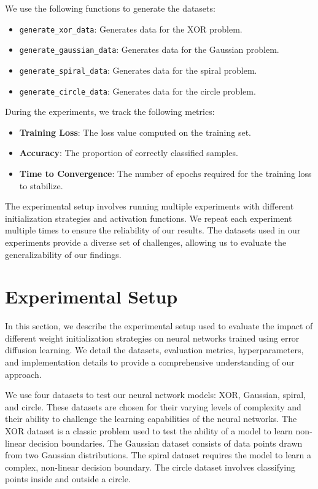 \documentclass{article} %
\begin{document}
We use the following functions to generate the datasets:
\begin{itemize}
    \item \texttt{generate\_xor\_data}: Generates data for the XOR problem.
    \item \texttt{generate\_gaussian\_data}: Generates data for the Gaussian problem.
    \item \texttt{generate\_spiral\_data}: Generates data for the spiral problem.
    \item \texttt{generate\_circle\_data}: Generates data for the circle problem.
\end{itemize}

During the experiments, we track the following metrics:
\begin{itemize}
    \item \textbf{Training Loss}: The loss value computed on the training set.
    \item \textbf{Accuracy}: The proportion of correctly classified samples.
    \item \textbf{Time to Convergence}: The number of epochs required for the training loss to stabilize.
\end{itemize}

The experimental setup involves running multiple experiments with different initialization strategies and activation functions. We repeat each experiment multiple times to ensure the reliability of our results. The datasets used in our experiments provide a diverse set of challenges, allowing us to evaluate the generalizability of our findings.

\section{Experimental Setup}
\label{sec:experimental}

In this section, we describe the experimental setup used to evaluate the impact of different weight initialization strategies on neural networks trained using error diffusion learning. We detail the datasets, evaluation metrics, hyperparameters, and implementation details to provide a comprehensive understanding of our approach.

We use four datasets to test our neural network models: XOR, Gaussian, spiral, and circle. These datasets are chosen for their varying levels of complexity and their ability to challenge the learning capabilities of the neural networks. The XOR dataset is a classic problem used to test the ability of a model to learn non-linear decision boundaries. The Gaussian dataset consists of data points drawn from two Gaussian distributions. The spiral dataset requires the model to learn a complex, non-linear decision boundary. The circle dataset involves classifying points inside and outside a circle.
\end{document}
